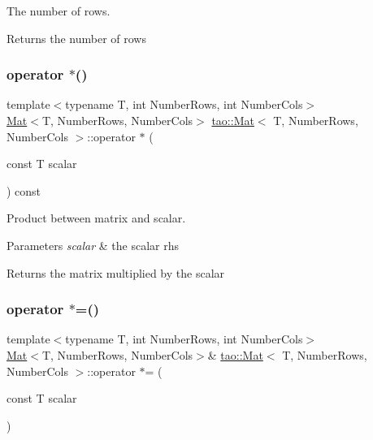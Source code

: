 The number of rows. 

\begin{DoxyReturn}{Returns}
the number of rows 
\end{DoxyReturn}
\mbox{\label{classtao_1_1_mat_a9b10422fcba8efcdf1965ebbc9134984}} 
\subsubsection{\texorpdfstring{operator $\ast$()}{operator *()}}
{\footnotesize\ttfamily template$<$typename T, int Number\+Rows, int Number\+Cols$>$ \\
\mbox{\hyperlink{classtao_1_1_mat}{Mat}}$<$T, Number\+Rows, Number\+Cols$>$ \mbox{\hyperlink{classtao_1_1_mat}{tao\+::\+Mat}}$<$ T, Number\+Rows, Number\+Cols $>$\+::operator $\ast$ (\begin{DoxyParamCaption}\item[{const T}]{scalar }\end{DoxyParamCaption}) const\hspace{0.3cm}{\ttfamily [inline]}}



Product between matrix and scalar. 


\begin{DoxyParams}{Parameters}
{\em scalar} & the scalar rhs \\
\hline
\end{DoxyParams}
\begin{DoxyReturn}{Returns}
the matrix multiplied by the scalar 
\end{DoxyReturn}
\mbox{\label{classtao_1_1_mat_ae684c7c3b2ccd9fc04b96170268a1af5}} 
\subsubsection{\texorpdfstring{operator $\ast$=()}{operator *=()}}
{\footnotesize\ttfamily template$<$typename T, int Number\+Rows, int Number\+Cols$>$ \\
\mbox{\hyperlink{classtao_1_1_mat}{Mat}}$<$T, Number\+Rows, Number\+Cols$>$\& \mbox{\hyperlink{classtao_1_1_mat}{tao\+::\+Mat}}$<$ T, Number\+Rows, Number\+Cols $>$\+::operator $\ast$= (\begin{DoxyParamCaption}\item[{const T}]{scalar }\end{DoxyParamCaption})\hspace{0.3cm}{\ttfamily [inline]}}



